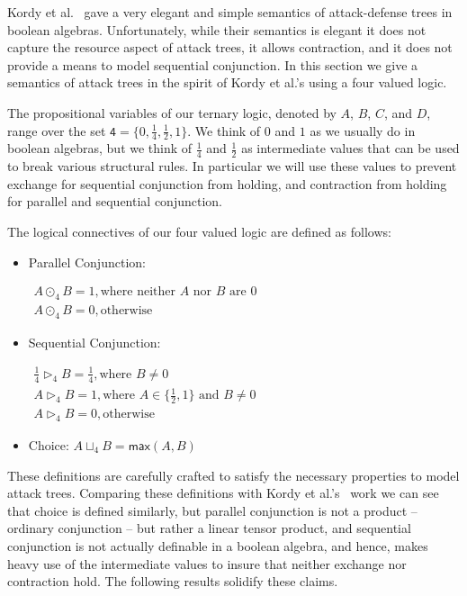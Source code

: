 \newcommand{\forth}{\frac{1}{4}}
\newcommand{\half}{\frac{1}{2}}

Kordy et al.~\cite{Kordy:2012} gave a very elegant and simple
semantics of attack-defense trees in boolean algebras.  Unfortunately,
while their semantics is elegant it does not capture the resource
aspect of attack trees, it allows contraction, and it does not provide
a means to model sequential conjunction.  In this section we give a
semantics of attack trees in the spirit of Kordy et al.'s using a four
valued logic.

The propositional variables of our ternary logic, denoted by $A$, $B$,
$C$, and $D$, range over the set $\mathsf{4} = \{0, \forth, \half,
1\}$.  We think of $0$ and $1$ as we usually do in boolean algebras,
but we think of $\forth$ and $\half$ as intermediate values that can
be used to break various structural rules.  In particular we will use
these values to prevent exchange for sequential conjunction from
holding, and contraction from holding for parallel and sequential
conjunction.
\begin{definition}
  \label{def:logical-connectives}
  The logical connectives of our four valued logic are defined as
  follows:
  \begin{itemize}
  \item[] Parallel Conjunction:
    \begin{center}
      \begin{math}
        \begin{array}{lll}
          A \odot_4 B = 1, \text{where neither $A$ nor $B$ are $0$}\\
          A \odot_4 B = 0, \text{otherwise}
        \end{array}
      \end{math}
    \end{center}
  \item[] Sequential Conjunction:
    \begin{center}
      \begin{math}
        \begin{array}{lll}
          \forth \rhd_4 B = \forth, \text{where $B \neq 0$}\\[2px]         
          A \rhd_4 B = 1, \text{where } A \in \{\half, 1\} \text{ and } B \neq 0\\
          A \rhd_4 B = 0, \text{otherwise}
        \end{array}
      \end{math}
    \end{center}
  \item[] Choice: $A \sqcup_4 B = \mathsf{max}(A,B)$    
  \end{itemize}
\end{definition}
These definitions are carefully crafted to satisfy the necessary
properties to model attack trees.  Comparing these definitions with
Kordy et al.'s~\cite{Kordy:2012} work we can see that choice is
defined similarly, but parallel conjunction is not a product --
ordinary conjunction -- but rather a linear tensor product, and
sequential conjunction is not actually definable in a boolean algebra,
and hence, makes heavy use of the intermediate values to insure that
neither exchange nor contraction hold.  The following results solidify
these claims.

